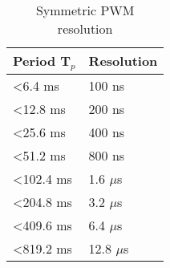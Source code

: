 \begin{table}[H]
\centering
\begin{tabular}{|l|l|}
\hline
\rowcolor[HTML]{34CDF9} 
\textbf{Period T$_p$} & \textbf{Resolution} \\ \hline
\textless 6.4 ms   & 100 ns              \\
\textless 12.8 ms  & 200 ns              \\
\textless 25.6 ms  & 400 ns              \\
\textless 51.2 ms  & 800 ns              \\
\textless 102.4 ms & 1.6 $\mu$s              \\
\textless 204.8 ms & 3.2 $\mu$s              \\
\textless 409.6 ms & 6.4 $\mu$s              \\
\textless 819.2 ms & 12.8 $\mu$s             \\ \hline
\end{tabular}
\caption{Symmetric PWM resolution}
\end{table}